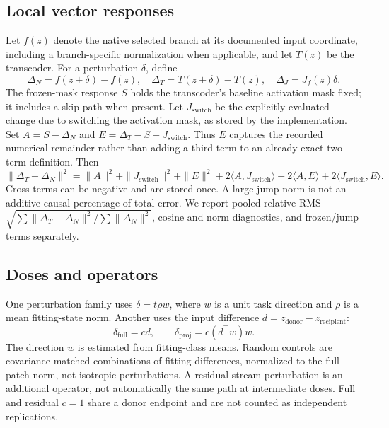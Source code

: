 \subsection{Local vector responses}
Let $f(z)$ denote the native selected branch at its documented input coordinate, including a branch-specific normalization when applicable, and let $T(z)$ be the transcoder. For a perturbation $\delta$, define
\begin{equation}
 \Delta_N=f(z+\delta)-f(z),\quad
 \Delta_T=T(z+\delta)-T(z),\quad
 \Delta_J=J_f(z)\delta.
\end{equation}
The frozen-mask response $S$ holds the transcoder's baseline activation mask fixed; it includes a skip path when present. Let $J_{\mathrm{switch}}$ be the explicitly evaluated change due to switching the activation mask, as stored by the implementation. Set $A=S-\Delta_N$ and $E=\Delta_T-S-J_{\mathrm{switch}}$. Thus $E$ captures the recorded numerical remainder rather than adding a third term to an already exact two-term definition. Then
\begin{equation}
 \|\Delta_T-\Delta_N\|^2=\|A\|^2+\|J_{\mathrm{switch}}\|^2+\|E\|^2
 +2\langle A,J_{\mathrm{switch}}\rangle+2\langle A,E\rangle+2\langle J_{\mathrm{switch}},E\rangle.
\end{equation}
Cross terms can be negative and are stored once. A large jump norm is not an additive causal percentage of total error. We report pooled relative RMS $\sqrt{\sum\|\Delta_T-\Delta_N\|^2/\sum\|\Delta_N\|^2}$, cosine and norm diagnostics, and frozen/jump terms separately.

\subsection{Doses and operators}
One perturbation family uses $\delta=t\rho w$, where $w$ is a unit task direction and $\rho$ is a mean fitting-state norm. Another uses the input difference $d=z_{\mathrm{donor}}-z_{\mathrm{recipient}}$:
\begin{equation}
 \delta_{\mathrm{full}}=cd,\qquad
 \delta_{\mathrm{proj}}=c(d^\top w)w.
\end{equation}
The direction $w$ is estimated from fitting-class means. Random controls are covariance-matched combinations of fitting differences, normalized to the full-patch norm, not isotropic perturbations. A residual-stream perturbation is an additional operator, not automatically the same path at intermediate doses. Full and residual $c=1$ share a donor endpoint and are not counted as independent replications.

